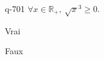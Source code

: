 \begin{truefalse}{q-701}
$\forall x \in \mathbb R_+,\: \sqrt x^3\geq 0$.
\item* Vrai
\item Faux
\end{truefalse}

